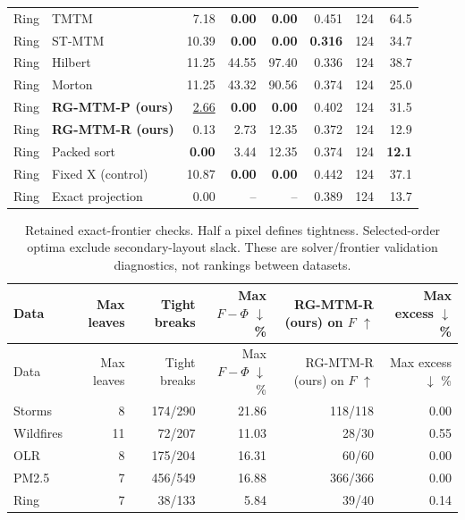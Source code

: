 \begin{longtable}{llrrrrrr}
Ring & TMTM & 7.18 & \textbf{0.00} & \textbf{0.00} & 0.451 & 124 & 64.5\\
Ring & ST-MTM & 10.39 & \textbf{0.00} & \textbf{0.00} & \textbf{0.316} & 124 & 34.7\\
Ring & Hilbert & 11.25 & 44.55 & 97.40 & 0.336 & 124 & 38.7\\
Ring & Morton & 11.25 & 43.32 & 90.56 & 0.374 & 124 & 25.0\\
Ring & \textbf{RG-MTM-P (ours)} & \underline{2.66} & \textbf{0.00} & \textbf{0.00} & 0.402 & 124 & 31.5\\
Ring & \textbf{RG-MTM-R (ours)} & 0.13 & 2.73 & 12.35 & 0.372 & 124 & 12.9\\
Ring & Packed sort & \textbf{0.00} & 3.44 & 12.35 & 0.374 & 124 & \textbf{12.1}\\
Ring & Fixed X (control) & 10.87 & \textbf{0.00} & \textbf{0.00} & 0.442 & 124 & 37.1\\
Ring & Exact projection & 0.00 & -- & -- & 0.389 & 124 & 13.7\\
\end{longtable}\endgroup

\begingroup\small\setlength{\tabcolsep}{4pt}
\begin{longtable}{lrrrrr}
\caption{Retained exact-frontier checks. Half a pixel defines tightness. Selected-order optima exclude secondary-layout slack. These are solver/frontier validation diagnostics, not rankings between datasets.}\\\toprule
Data & Max leaves & Tight breaks & Max $F-\Phi$ $\downarrow$ \% & RG-MTM-R (ours) on $F$ $\uparrow$ & Max excess $\downarrow$ \%\\\midrule\endfirsthead
\toprule Data & Max leaves & Tight breaks & Max $F-\Phi$ $\downarrow$ \% & RG-MTM-R (ours) on $F$ $\uparrow$ & Max excess $\downarrow$ \%\\\midrule\endhead
\bottomrule\endfoot
Storms & 8 & 174/290 & 21.86 & 118/118 & 0.00\\
Wildfires & 11 & 72/207 & 11.03 & 28/30 & 0.55\\
OLR & 8 & 175/204 & 16.31 & 60/60 & 0.00\\
PM2.5 & 7 & 456/549 & 16.88 & 366/366 & 0.00\\
Ring & 7 & 38/133 & 5.84 & 39/40 & 0.14\\
\end{longtable}\endgroup

